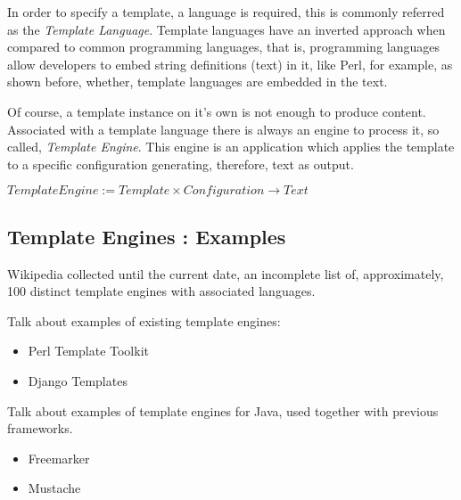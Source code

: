 In order to specify a template, a language is required, this is commonly referred as the \textit{Template Language}. Template languages have an inverted approach when compared to common programming languages, that is, programming languages allow developers to embed string definitions (text) in it, like Perl, for example, as shown before, whether, template languages are embedded in the text.

Of course, a template instance on it's own is not enough to produce content. Associated with a template language there is always an engine to process it, so called, \textit{Template Engine}. This engine is an application which applies the template to a specific configuration generating, therefore, text as output.

\begin{center}
    $TemplateEngine := Template \times Configuration \rightarrow Text$
\end{center}

\subsection{Template Engines : Examples}

Wikipedia collected \cite{WikipediaComparisonEngines} until the current date, an incomplete list of, approximately, 100 distinct template engines with associated languages.

\begin{expand}
    Talk about examples of existing template engines:
    
    \begin{itemize}
        \item Perl Template Toolkit \cite{Chamberlain2003PerlToolkit}
        \item Django Templates \cite{Newman2008DjangoMore} 
    \end{itemize}
\end{expand}

\begin{expand}
    Talk about examples of template engines for Java, used together with previous frameworks.
    \begin{itemize}
        \item Freemarker \cite{Forsythe2013InstantFreemarker}
        \item Mustache
        \cite{Forsythe2013InstantFreemarker}
    \end{itemize}
\end{expand}


